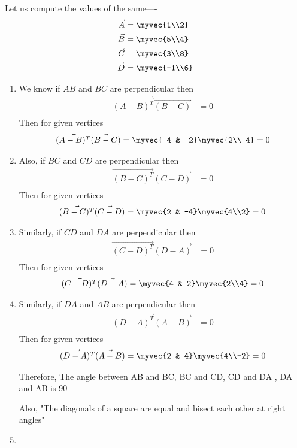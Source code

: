 \documentclass[journal,12pt,twocolumn]{IEEEtran}
\begin{document}
Let us compute the values of the same----
\begin{align}
\vec {A} &=\myvec {1\\2}\\
\vec {B}&=\myvec {5\\4}\\
\vec {C}&=\myvec {3\\8}\\
\vec {D}&=\myvec {-1\\6}
\end{align}
\begin{enumerate}
\item
We know if $AB$ and $BC$ are perpendicular then
\begin{align}
\vec{(A-B)^T}\vec{(B-C)}&=0\\
\end{align}
Then for given vertices 
\begin{align}
\vec{(A-B)^T}\vec{(B-C)}=\myvec {-4 & -2}\myvec {2\\-4} = 0
\end{align}
\item
Also, if $BC$ and $CD$ are perpendicular then
\begin{align}
\vec{(B-C)^T}\vec{(C-D)}&=0\\
\end{align}
Then for given vertices 
\begin{align}
\vec{(B-C)^T}\vec{(C-D)}=\myvec {2 & -4}\myvec {4\\2}= 0
\end{align}
\item 
Similarly, if $CD$ and $DA$ are perpendicular then
\begin{align}
\vec{(C-D)^T}\vec{(D-A)}&=0\\
\end{align}
Then for given vertices 
\begin{align}
\vec{(C-D)^T}\vec{(D-A)}=\myvec {4 & 2}\myvec {2\\4} = 0
\end{align}


\item
Similarly, if $DA$ and $AB$ are perpendicular then
\begin{align}
\vec{(D-A)^T}\vec{(A-B)}&=0\\
\end{align}
Then for given vertices 
\begin{align}
\vec{(D-A)^T}\vec{(A-B)}=\myvec {2 & 4}\myvec {4\\-2}= 0
\end{align}

Therefore, The angle between AB and BC, BC and CD, CD and DA , DA and AB is 90\degree

Also, "The diagonals of a square are equal and bisect each other at right angles"



\item 
\end{enumerate}
\end{document}
